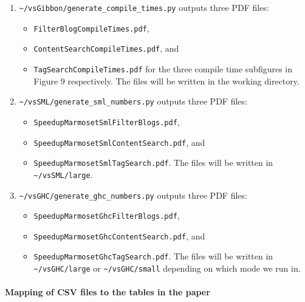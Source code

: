 \begin{enumerate}
\def\labelenumi{\arabic{enumi}.}
\tightlist
\item
  \texttt{\textasciitilde{}/vsGibbon/generate\_compile\_times.py}
  outputs three PDF files:

  \begin{itemize}
  \tightlist
  \item
    \texttt{FilterBlogCompileTimes.pdf},
  \item
    \texttt{ContentSearchCompileTimes.pdf}, and
  \item
    \texttt{TagSearchCompileTimes.pdf} for the three compile time
    subfigures in Figure 9 respectively. The files will be written in
    the working directory.
  \end{itemize}
\item
  \texttt{\textasciitilde{}/vsSML/generate\_sml\_numbers.py} outputs
  three PDF files:

  \begin{itemize}
  \tightlist
  \item
    \texttt{SpeedupMarmosetSmlFilterBlogs.pdf},
  \item
    \texttt{SpeedupMarmosetSmlContentSearch.pdf}, and
  \item
    \texttt{SpeedupMarmosetSmlTagSearch.pdf}. The files will be written
    in \texttt{\textasciitilde{}/vsSML/large}.
  \end{itemize}
\item
  \texttt{\textasciitilde{}/vsGHC/generate\_ghc\_numbers.py} outputs
  three PDF files:

  \begin{itemize}
  \tightlist
  \item
    \texttt{SpeedupMarmosetGhcFilterBlogs.pdf},
  \item
    \texttt{SpeedupMarmosetGhcContentSearch.pdf}, and
  \item
    \texttt{SpeedupMarmosetGhcTagSearch.pdf}. The files will be written
    in \texttt{\textasciitilde{}/vsGHC/large} or
    \texttt{\textasciitilde{}/vsGHC/small} depending on which mode we
    run in.
  \end{itemize}
\end{enumerate}

\hypertarget{mapping-of-csv-files-to-the-tables-in-the-paper}{%
\paragraph{Mapping of CSV files to the tables in the
paper}\label{mapping-of-csv-files-to-the-tables-in-the-paper}}

